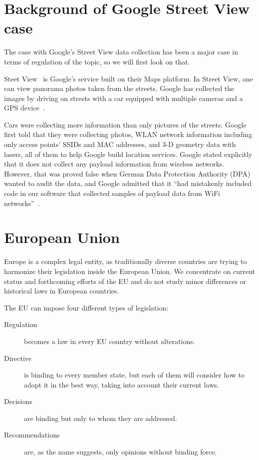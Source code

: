 \documentclass[12pt,a4paper,oneside,pdftex]{report}
\begin{document}
\section{Background of Google Street View case}
\label{sec:streetview}

The case with Google's Street View data collection has been a major case in terms of regulation of the topic, so we will first look on that. 

Steet View~\cite{googlestreetview} is Google's service built on their Maps platform. In Street View, one can view panorama photos taken from the streets. Google has collected the images by driving on streets with a car equipped with multiple cameras and a GPS device~\cite{streetview_behindscenes}.

Cars were collecting more information than only pictures of the streets. Google first told that they were collecting photos, WLAN network information including only access points' SSIDs and MAC addresses, and 3-D geometry data with lasers, all of them to help Google build location services. Google stated explicitly that it does not collect any payload information from wireless networks.~\cite{fleischer_datacollected,google_wifi_collection} However, that was proved false when German Data Protection Authority (DPA) wanted to audit the data, and Google admitted that it ``had mistakenly included code in our software that collected samples of payload data from WiFi networks''~\cite{eustace_datacollected}.

\section{European Union}
\label{sec:legal_europe}

Europe is a complex legal entity, as traditionally diverse countries are trying to harmonize their legislation inside the European Union. We concentrate on current status and forthcoming efforts of the EU and do not study minor differences or historical laws in European countries.

The EU can impose four different types of legislation:~\cite{lisbon_288}
\begin{description}
     \item[Regulation] becomes a law in every EU country without alterations.
     \item[Directive] is binding to every member state, but each of them will consider how to adopt it in the best way, taking into account their current laws.
     \item[Decisions] are binding but only to whom they are addressed.
     \item[Recommendations] are, as the name suggests, only opinions without binding force.
\end{description}
\end{document}
